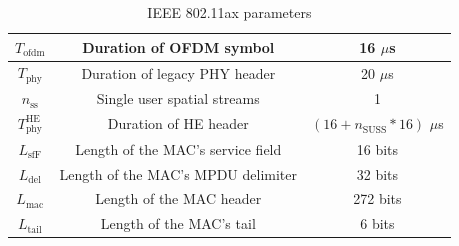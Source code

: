\documentclass[a4paper]{article}
\begin{document}
\begin{table}[h]
{\begin{tabular}{|c|c|c|}
			$T_\text{ofdm}$      & Duration of OFDM symbol     & 16 $\mu$s           \\ \hline
			$T_\text{phy}$      & Duration of legacy PHY header       & 20 $\mu$s           \\ \hline
			$n_\text{ss}$               & Single user spatial streams       & 1           \\ \hline
			$T_\text{phy}^\text{HE}$      & Duration of HE header       & $(16 + n_\text{SUSS} * 16)$ $\mu$s           \\ \hline
			$L_\text{sfF}$      & Length of the MAC's service field       & 16 bits           \\ \hline
			$L_\text{del}$      & Length of the MAC's MPDU delimiter       & 32 bits           \\ \hline
			$L_\text{mac}$      & Length of the MAC header     & 272 bits           \\ \hline
			$L_\text{tail}$      & Length of the MAC's tail     & 6 bits           \\ \hline
			\end{tabular}}
			\caption{IEEE 802.11ax parameters}
			\label{table:appendix_table}
		\end{table}

\end{document}
